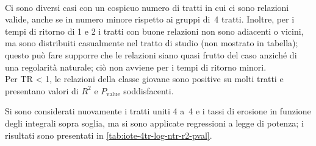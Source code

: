 %
\\
Ci sono diversi casi con un cospicuo numero di tratti in cui ci sono relazioni valide, anche se in numero minore rispetto ai gruppi di~4 tratti.
Inoltre, per i tempi di ritorno di \SI{1}{\anno} e \SI{2}{\anni} i tratti con buone relazioni non sono adiacenti o vicini, ma sono distribuiti casualmente nel tratto di studio (non mostrato in tabella); questo può fare supporre che le relazioni siano quasi frutto del caso anziché di una regolarità naturale; ciò non avviene per i tempi di ritorno minori.
\\
Per TR \SI{< 1}{\anno}, le relazioni della classe giovane sono positive su molti tratti e presentano valori di $R^2$ e $P_\mathrm{value}$ soddisfacenti.


Si sono considerati nuovamente i tratti uniti 4 a~4 e i tassi di erosione in funzione degli integrali sopra soglia, ma si sono applicate regressioni a legge di potenza; i risultati sono presentati in \cref{tab:iote-4tr-log-ntr-r2-pval}.
%
